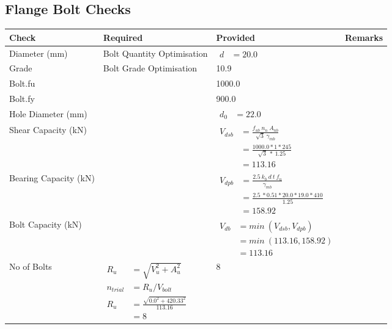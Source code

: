 \documentclass{article}%
\begin{document}
\subsection{Flange Bolt Checks}%
\label{subsec:FlangeBoltChecks}%
\renewcommand{\arraystretch}{1.2}%
\begin{longtable}{|p{4cm}|p{5cm}|p{5.5cm}|p{1.5cm}|}%
\hline%
\rowcolor{OsdagGreen}%
Check&Required&Provided&Remarks\\%
\hline%
\endhead%
\hline%
Diameter (mm)&Bolt Quantity Optimisation&$\begin{aligned} d &=20.0\end{aligned}$&\\%
\hline%
Grade&Bolt Grade Optimisation&10.9&\\%
\hline%
Bolt.fu&&1000.0&\\%
\hline%
Bolt.fy&&900.0&\\%
\hline%
Hole Diameter (mm)& &$\begin{aligned} d_0 &=22.0\end{aligned}$&\\%
\hline%
Shear Capacity (kN)&&$\begin{aligned}V_{dsb} &= \frac{f_{ub} ~n_n~ A_{nb}}{\sqrt{3} ~\gamma_{mb}}\\ &= \frac{1000.0*1*245}{\sqrt{3}~*~1.25}\\ &= 113.16\end{aligned}$&\\%
\hline%
Bearing Capacity (kN)&&$\begin{aligned}V_{dpb} &= \frac{2.5~ k_b~ d~ t~ f_u}{\gamma_{mb}}\\ &= \frac{2.5~*0.51*20.0*19.0*410}{1.25}\\ &=158.92\end{aligned}$&\\%
\hline%
Bolt Capacity (kN)&&$\begin{aligned}V_{db} &= min~ (V_{dsb}, V_{dpb})\\ &= min~ (113.16,158.92)\\ &=113.16\end{aligned}$&\\%
\hline%
No of Bolts&$\begin{aligned}R_{u} &= \sqrt{V_u^2+A_u^2}\\ n_{trial} &= R_u/ V_{bolt}\\ R_{u} &= \frac{\sqrt{0.0^2+420.33^2}}{113.16}\\ &=8\end{aligned}$&8&\\%
\hline%

\end{longtable}
\end{document}
